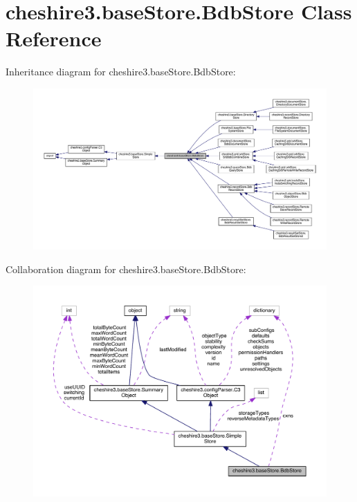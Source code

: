 \hypertarget{classcheshire3_1_1base_store_1_1_bdb_store}{\section{cheshire3.\-base\-Store.\-Bdb\-Store Class Reference}
\label{classcheshire3_1_1base_store_1_1_bdb_store}
}


Inheritance diagram for cheshire3.\-base\-Store.\-Bdb\-Store\-:
\nopagebreak
\begin{figure}[H]
\begin{center}
\leavevmode
\includegraphics[width=350pt]{classcheshire3_1_1base_store_1_1_bdb_store__inherit__graph}
\end{center}
\end{figure}


Collaboration diagram for cheshire3.\-base\-Store.\-Bdb\-Store\-:
\nopagebreak
\begin{figure}[H]
\begin{center}
\leavevmode
\includegraphics[width=350pt]{classcheshire3_1_1base_store_1_1_bdb_store__coll__graph}
\end{center}
\end{figure}
